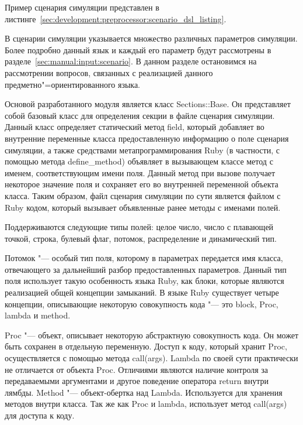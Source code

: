 Пример сценария симуляции представлен в листинге~\ref{sec:development:preprocessor:scenario_dsl_listing}.



В сценарии симуляции указывается множество различных параметров симуляции.
Более подробно данный язык и каждый его параметр будут рассмотрены в разделе~\ref{sec:manual:input:scenario}.
В данном разделе остановимся на рассмотрении вопросов, связанных с реализацией данного предметно"=ориентированного языка.

Основой разработанного модуля является класс Sections::Base. Он представляет собой базовый класс для определения секции в файле сценария симуляции.
Данный класс определяет статический метод field, который добавляет во внутренние переменные класса предоставленную информацию о поле сценария симуляции,
а также средствами метапрограммирования Ruby (в частности, с помощью метода define\_method) объявляет в вызывающем классе метод с именем, соответствующим имени поля.
Данный метод при вызове получает некоторое значение поля и сохраняет его во внутренней переменной объекта класса.
Таким образом, файл сценария симуляции по сути является файлом с Ruby кодом, который вызывает объявленные ранее методы с именами полей.

Поддерживаются следующие типы полей: целое число, число с плавающей точкой, строка, булевый флаг, потомок, распределение и динамический тип.

Потомок "--- особый тип поля, которому в параметрах передается имя класса, отвечающего за дальнейший разбор предоставленных параметров.
Данный тип поля использует такую особенность языка Ruby, как блоки, которые являются реализацией общей концепции замыканий.
В языке Ruby существует четыре концепции, описывающие некоторую совокупность кода "--- это block, Proc, lambda и method.

Proc "--- объект, описывает некоторую абстрактную совокупность кода. Он может быть сохранен в отдельную переменную. Доступ к коду, который хранит Proc, осуществляется с помощью метода call(args).
Lambda по своей сути практически не отличается от объекта Proc. Отличиями являются наличие контроля за передаваемыми аргументами и другое поведение оператора return внутри лямбды.
Method "--- объект-обертка над Lambda. Используется для хранения методов внутри класса. Так же как Proc и lambda, использует метод call(args) для доступа к коду.

